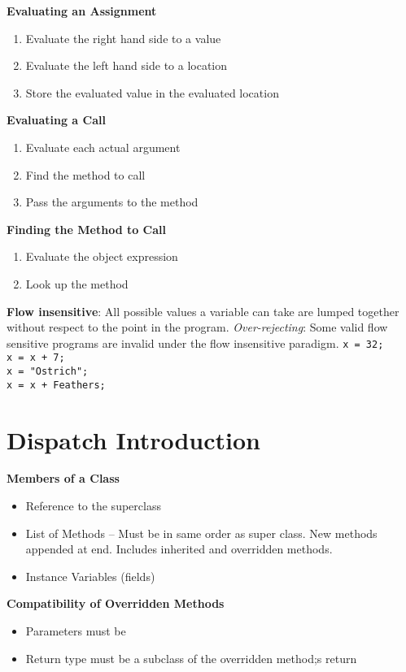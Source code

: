 \documentclass[10pt,twocolumn]{report}
\begin{document}
\textbf{Evaluating an Assignment}
\begin{enumerate}
  \item Evaluate the right hand side to a value
  \item Evaluate the left hand side to a location
  \item Store the evaluated value in the evaluated location
\end{enumerate}

\textbf{Evaluating a Call}
\begin{enumerate}
  \item Evaluate each actual argument
  \item Find the method to call
  \item Pass the arguments to the method
\end{enumerate}

\textbf{Finding the Method to Call}
\begin{enumerate}
  \item Evaluate the object expression
  \item Look up the method
\end{enumerate}

\textbf{Flow insensitive}: All possible values a variable can take are lumped together without respect to the point in the program.  \emph{Over-rejecting}: Some valid flow sensitive programs are invalid under the flow insensitive paradigm.
{\tt x = 32;}\\
{\tt x = x + 7;}\\
{\tt x = "Ostrich";}\\
{\tt x = x + Feathers;}
\section{Dispatch Introduction}

\textbf{Members of a Class}
\begin{itemize}
  \item Reference to the superclass
  \item List of Methods -- Must be in same order as super class.  New methods appended at end. Includes inherited and overridden methods.
  \item Instance Variables (fields)
\end{itemize}

\textbf{Compatibility of Overridden Methods}
\begin{itemize}
  \item Parameters must be
  \item Return type must be a subclass of the overridden method;s return
\end{itemize}
\end{document}
